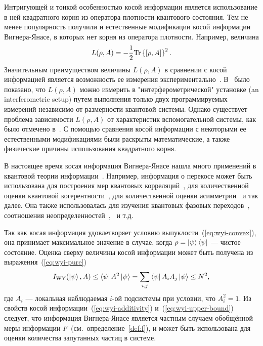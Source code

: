 Интригующей и тонкой особенностью косой информации является использование в ней квадратного корня из оператора плотности квантового состояния.
Тем не менее популярность получили и естественные модификации косой информации Вигнера-Янасе,
в которых нет корня из оператора плотности.
Например, величина
%
\begin{equation}\label{eq:wyi-modification-l}
  L(\rho, A)
  = -\frac{1}{2} \mathrm{Tr} \left\{ \left[\rho, A\right] \right\}^2.
\end{equation}
%
Значительным преимуществом величины $L(\rho, A)$ в сравнении с косой информацией является возможность ее измерения экспериментально~\cite{Girolami2014}.
В~\cite{Karpat2014} было показано,
что $L(\rho, A)$ можно измерить в "интерферометрической" установке (an interferometric setup) путем выполнения только двух программируемых измерений независимо от размерности квантовой системы.
Однако существует проблема зависимости $L(\rho, A)$ от характеристик вспомогательной системы, как было отмечено в~\cite{Yadin2016}.
С помощью сравнения косой информации с некоторыми ее естественными модификациями были раскрыты\cite{Luo2020} математические,
а также физические причины использования квадратного корня.

В настоящее время косая информация Вигнера-Янасе нашла много применений в квантовой теории информации~\cite{Wigner1963, Luo2017}.
Например, информация о перекосе может быть использована для построения мер квантовых корреляций~\cite{Luo2005, Luo2012, Li2016a, Sun2017},
для количественной оценки квантовой когерентности~\cite{Girolami2014, Yu2017, Luo2017, Luo2018},
для количественной оценки асимметрии~\cite{Luo2018} и так далее.
Она также использовалась для изучения квантовых фазовых переходов~\cite{Karpat2014, Malvezzi2016, Li2016b, Lei2016, Qiu2017}, соотношения неопределенностей~\cite{Luo2005},~\cite{Yanagi2005, Furuichi2010, Chen2016} и т.д.

Так как косая информация удовлетворяет условию выпуклости~(\ref{eq:wyi-convex}),
она принимает максимальное значение в случае,
когда $\rho = \left| \psi \right\rangle\left\langle \psi \right|$ --- чистое состояние.
Оценка сверху величины косой информации может быть получена из выражения~(\ref{eq:wyi-pure})
%
\begin{equation}\label{eq:wyi-upper-bound}
  I_\mathrm{WY}(\left| \psi \right\rangle, A)
  \leq  \left\langle \psi \right| A^2 \left| \psi \right\rangle
  = \sum\limits_{i, j} \left\langle \psi \right| A_i A_j \left| \psi \right\rangle
  \leq N^2,
\end{equation}
%
где $A_i$ --- локальная наблюдаемая $i$-ой подсистемы при условии,
что $A_i^2 = 1$.
Из свойств косой информации~(\ref{eq:wyi-additivity}) и~(\ref{eq:wyi-upper-bound}) следует,
что информация Вигнера-Янасе является частным
случаем обобщённой меры информации $F$~(см.~определение~\ref{def:f}),
и может быть использована для оценки количества запутанных частиц в системе.


